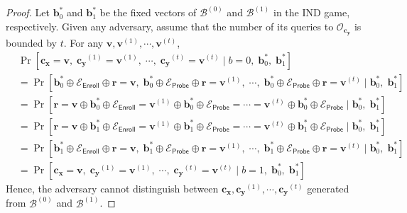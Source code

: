 \begin{proof}

Let $\mathbf{b}^*_0$ and $\mathbf{b}^*_1$ be the fixed vectors of $\mathcal{B}^{(0)}$ and $\mathcal{B}^{(1)}$ in the \textsf{IND} game, respectively. Given any adversary, assume that the number of its queries to $\mathcal{O}_{\mathbf{c_y}}$ is bounded by $t$. For any $\mathbf{v}, \mathbf{v}^{(1)}, \cdots, \mathbf{v}^{(t)}$,
\begin{align*}
	& \Pr[ \mathbf{c_x} = \mathbf{v},\; \mathbf{c_y}^{(1)} = \mathbf{v}^{(1)},\; \cdots,\; \mathbf{c_y}^{(t)} = \mathbf{v}^{(t)} \mid b = 0,\; \mathbf{b}^*_0,\; \mathbf{b}^*_1 ] \\
	&= \Pr[ \mathbf{b}^*_0 \oplus \mathcal{E}_{\textsf{Enroll}} \oplus \mathbf{r} = \mathbf{v},\; \mathbf{b}^*_0 \oplus \mathcal{E}_{\textsf{Probe}} \oplus \mathbf{r} =\mathbf{v}^{(1)},\; \cdots,\; \mathbf{b}^*_0 \oplus \mathcal{E}_{\textsf{Probe}} \oplus \mathbf{r} =\mathbf{v}^{(t)} \mid \mathbf{b}^*_0,\; \mathbf{b}^*_1] \\ 
	&= \Pr[ \mathbf{r} = \mathbf{v} \oplus \mathbf{b}^*_0 \oplus \mathcal{E}_{\textsf{Enroll}} =\mathbf{v}^{(1)} \oplus \mathbf{b}^*_0 \oplus \mathcal{E}_{\textsf{Probe}} = \cdots = \mathbf{v}^{(t)} \oplus \mathbf{b}^*_0 \oplus \mathcal{E}_{\textsf{Probe}} \mid \mathbf{b}^*_0,\; \mathbf{b}^*_1] \\ 
	&= \Pr[ \mathbf{r} = \mathbf{v} \oplus \mathbf{b}^*_1 \oplus \mathcal{E}_{\textsf{Enroll}} = \mathbf{v}^{(1)} \oplus \mathbf{b}^*_1 \oplus \mathcal{E}_{\textsf{Probe}} = \cdots = \mathbf{v}^{(t)} \oplus \mathbf{b}^*_1 \oplus \mathcal{E}_{\textsf{Probe}} \mid \mathbf{b}^*_0,\; \mathbf{b}^*_1] \\ 
	&= \Pr[ \mathbf{b}^*_1 \oplus \mathcal{E}_{\textsf{Enroll}} \oplus \mathbf{r} = \mathbf{v},\; \mathbf{b}^*_1 \oplus \mathcal{E}_{\textsf{Probe}} \oplus \mathbf{r} =\mathbf{v}^{(1)},\; \cdots,\; \mathbf{b}^*_1 \oplus \mathcal{E}_{\textsf{Probe}} \oplus \mathbf{r} =\mathbf{v}^{(t)} \mid \mathbf{b}^*_0,\; \mathbf{b}^*_1] \\ 
	&= \Pr[ \mathbf{c_x} = \mathbf{v},\; \mathbf{c_y}^{(1)} = \mathbf{v}^{(1)},\; \cdots,\; \mathbf{c_y}^{(t)} = \mathbf{v}^{(t)} \mid b = 1,\; \mathbf{b}^*_0,\; \mathbf{b}^*_1  ]
\end{align*}
Hence, the adversary cannot distinguish between $\mathbf{c_x}, \mathbf{c_y}^{(1)}, \cdots, \mathbf{c_y}^{(t)}$ generated from $\mathcal{B}^{(0)}$ and $\mathcal{B}^{(1)}$.

\end{proof}
